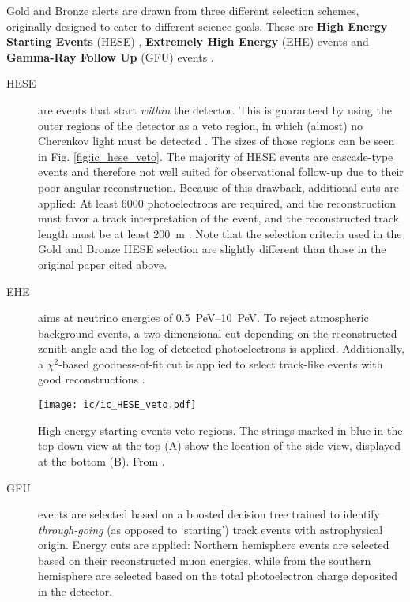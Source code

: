 Gold and Bronze alerts are drawn from three different selection schemes, originally designed to cater to different science goals. These are \textbf{High Energy Starting Events} (HESE) , \textbf{Extremely High Energy} (EHE) events  and \textbf{Gamma-Ray Follow Up} (GFU) events .

\begin{description}

    \item[HESE] are events that start \textit{within} the detector. This is guaranteed by using the outer regions of the detector as a veto region, in which (almost) no Cherenkov light must be detected \cite{Aartsen2013}. The sizes of those regions can be seen in Fig. \ref{fig:ic_hese_veto}. The majority of HESE events are cascade-type events and therefore not well suited for observational follow-up due to their poor angular reconstruction. Because of this drawback, additional cuts are applied: At least 6000 photoelectrons are required, and the reconstruction must favor a track interpretation of the event, and the reconstructed track length must be at least \SI{200}{\meter} \cite{Abbasi2023}. Note that the selection criteria used in the Gold and Bronze HESE selection are slightly different than those in the original paper cited above.

    \item[EHE] aims at neutrino energies of \SIrange{0.5}{10}{\peta\eV}. To reject atmospheric background events, a two-dimensional cut depending on the reconstructed zenith angle and the log of detected photoelectrons is applied. Additionally, a $\chi^2$-based goodness-of-fit cut is applied to select track-like events with good reconstructions \cite{Abbasi2023}.

    \begin{marginfigure}
        \texttt{[image: ic/ic\_HESE\_veto.pdf]}
        \caption[HESE veto regions]{High-energy starting events veto regions. The strings marked in blue in the top-down view at the top (A) show the location of the side view, displayed at the bottom (B). From \cite{Aartsen2013}.}
    \end{marginfigure}

    \item[GFU] events are selected based on a boosted decision tree trained to identify \textit{through-going} (as opposed to `starting') track events with astrophysical origin. Energy cuts are applied: Northern hemisphere events are selected based on their reconstructed muon energies, while from the southern hemisphere are selected based on the total photoelectron charge deposited in the detector.
\end{description}

